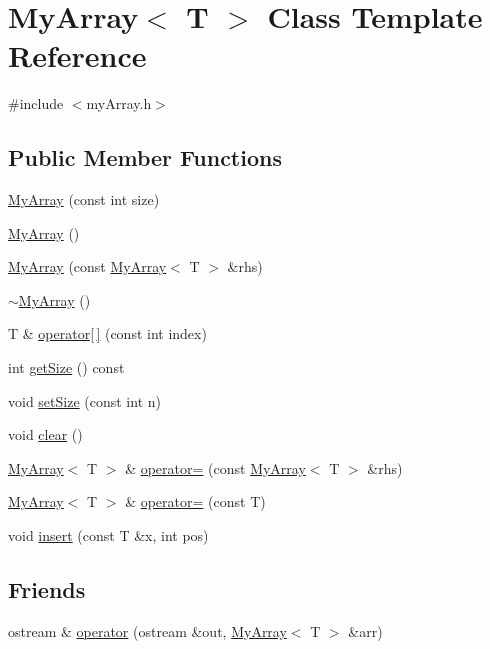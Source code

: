 \hypertarget{classMyArray}{}\section{My\+Array$<$ T $>$ Class Template Reference}
\label{classMyArray}


{\ttfamily \#include $<$my\+Array.\+h$>$}

\subsection*{Public Member Functions}
\begin{DoxyCompactItemize}
\item 
\hyperlink{classMyArray_a5e2f56ae6e3b87c1635bedf8b4b76fb9}{My\+Array} (const int size)
\item 
\hyperlink{classMyArray_acb3cd41349cf47f00e119061894929a6}{My\+Array} ()
\item 
\hyperlink{classMyArray_a03c11ccacb545bdcaf686747d3dc741d}{My\+Array} (const \hyperlink{classMyArray}{My\+Array}$<$ T $>$ \&rhs)
\item 
\hyperlink{classMyArray_a55bc32d921ca509c9820549cb8baac22}{$\sim$\+My\+Array} ()
\item 
T \& \hyperlink{classMyArray_a49f2d5aa8d69d077b1c17f076f097406}{operator\mbox{[}$\,$\mbox{]}} (const int index)
\item 
int \hyperlink{classMyArray_a0b7673af1b2f8d69f9345b3fd817cce4}{get\+Size} () const 
\item 
void \hyperlink{classMyArray_ab2e0c78689ddcfd142dbef361b7c0339}{set\+Size} (const int n)
\item 
void \hyperlink{classMyArray_a631fd2535793febd2f7acd7c70ca94b6}{clear} ()
\item 
\hyperlink{classMyArray}{My\+Array}$<$ T $>$ \& \hyperlink{classMyArray_a2f16f482ff8b1f600d288a9ca04c2658}{operator=} (const \hyperlink{classMyArray}{My\+Array}$<$ T $>$ \&rhs)
\item 
\hyperlink{classMyArray}{My\+Array}$<$ T $>$ \& \hyperlink{classMyArray_a04128aefb2c6a87d84cc29fdc6aeade7}{operator=} (const T)
\item 
void \hyperlink{classMyArray_a0c00635e4361df03eff1c371c1ab5567}{insert} (const T \&x, int pos)
\end{DoxyCompactItemize}
\subsection*{Friends}
\begin{DoxyCompactItemize}
\item 
ostream \& \hyperlink{classMyArray_affe58e61c0c2cd8a54240bb543d827aa}{operator} (ostream \&out, \hyperlink{classMyArray}{My\+Array}$<$ T $>$ \&arr)
\end{DoxyCompactItemize}


